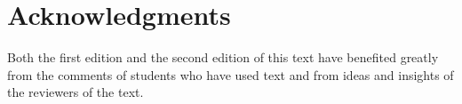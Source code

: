 \section*{Acknowledgments}
Both the first edition and the second edition of this text have benefited greatly from the comments of students who have used text and from ideas and insights of the reviewers of the text.  %
%

